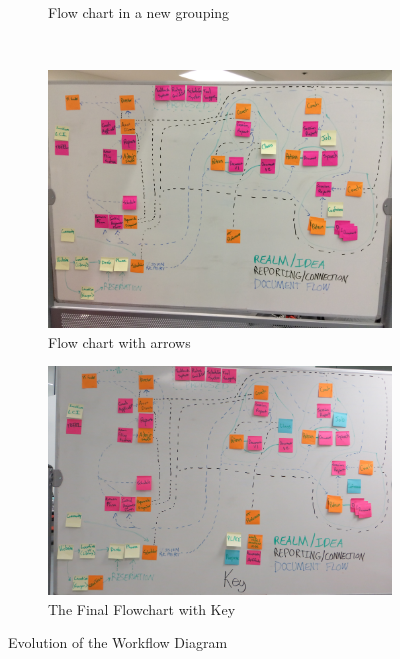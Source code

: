 \documentclass[12pt]{article} %
\begin{document}
\begin{figure}[H]
\begin{subfigure}{.5\linewidth}
      \caption{Flow chart in a new grouping}
      \label{fig:flowchart_without_arrows}
    \end{subfigure}\\[1ex]
    \begin{subfigure}{.5\linewidth}
      \centering
      \includegraphics[width=0.95\linewidth]{flow/flowchart_with_arrows}
      \caption{Flow chart with arrows}
      \label{fig:flowchart_with_arrows}
    \end{subfigure}%
    \begin{subfigure}{.5\linewidth}
      \centering
      \includegraphics[width=0.95\linewidth]{flow/flowchart_final}
      \caption{The Final Flowchart with Key}
      \label{fig:flowchart_final_small}
    \end{subfigure}
    \caption{Evolution of the Workflow Diagram}
    \label{fig:Workflow_Evolution}
  \end{figure}
\end{document}
